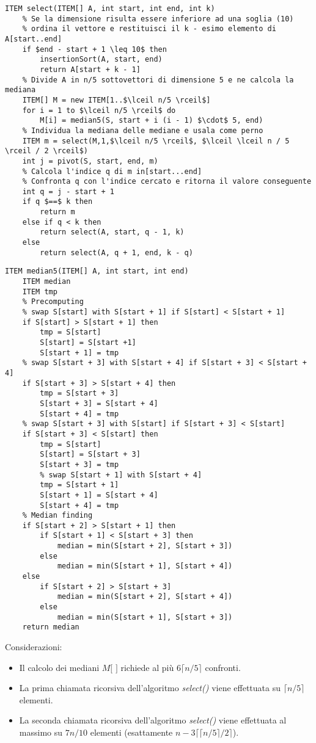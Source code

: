 \documentclass[../cheatSheetAlgoritmi.tex]{subfiles}
\begin{document}
\begin{lstlisting}[caption=Mediana deterministica in $\mathcal{O}(n)$]
ITEM select(ITEM[] A, int start, int end, int k)
	% Se la dimensione risulta essere inferiore ad una soglia (10) 
	% ordina il vettore e restituisci il k - esimo elemento di A[start..end]
	if $end - start + 1 \leq 10$ then 
		insertionSort(A, start, end)
		return A[start + k - 1]
	% Divide A in n/5 sottovettori di dimensione 5 e ne calcola la mediana
	ITEM[] M = new ITEM[1..$\lceil n/5 \rceil$]
	for i = 1 to $\lceil n/5 \rceil$ do
		M[i] = median5(S, start + i (i - 1) $\cdot$ 5, end)
	% Individua la mediana delle mediane e usala come perno
	ITEM m = select(M,1,$\lceil n/5 \rceil$, $\lceil \lceil n / 5 \rceil / 2 \rceil$)
	int j = pivot(S, start, end, m)
	% Calcola l'indice q di m in[start...end]
	% Confronta q con l'indice cercato e ritorna il valore conseguente
	int q = j - start + 1
	if q $==$ k then
		return m
	else if q < k then
		return select(A, start, q - 1, k)
	else
		return select(A, q + 1, end, k - q)
\end{lstlisting}
\newpage
\begin{lstlisting}[caption=median5]
ITEM median5(ITEM[] A, int start, int end)
	ITEM median
	ITEM tmp 
	% Precomputing
	% swap S[start] with S[start + 1] if S[start] < S[start + 1] 
	if S[start] > S[start + 1] then
		tmp = S[start]
		S[start] = S[start +1]
		S[start + 1] = tmp
	% swap S[start + 3] with S[start + 4] if S[start + 3] < S[start + 4] 
	if S[start + 3] > S[start + 4] then
		tmp = S[start + 3]
		S[start + 3] = S[start + 4]
		S[start + 4] = tmp
	% swap S[start + 3] with S[start] if S[start + 3] < S[start] 
	if S[start + 3] < S[start] then
		tmp = S[start]
		S[start] = S[start + 3]
	 	S[start + 3] = tmp
	 	% swap S[start + 1] with S[start + 4]
		tmp = S[start + 1]
		S[start + 1] = S[start + 4]
		S[start + 4] = tmp 
	% Median finding
	if S[start + 2] > S[start + 1] then
		if S[start + 1] < S[start + 3] then
			median = min(S[start + 2], S[start + 3]) 
		else 
			median = min(S[start + 1], S[start + 4])
	else
		if S[start + 2] > S[start + 3] 
			median = min(S[start + 2], S[start + 4]) 
		else 
			median = min(S[start + 1], S[start + 3]) 
	return median
\end{lstlisting}
Considerazioni:
\begin{itemize}
	\item Il calcolo dei mediani $M[$ $]$ richiede al più $6 \lceil n/5 \rceil$ confronti. 
	\item La prima chiamata ricorsiva dell'algoritmo \emph{select()} viene effettuata su  $\lceil n/5 \rceil$ elementi.
	\item La seconda chiamata ricorsiva dell’algoritmo \emph{select()} viene effettuata al massimo su $7n/10$ elementi (esattamente $n - 3 \lceil \lceil n/5 \rceil /2 \rceil$).  
\end{itemize}
\end{document}
